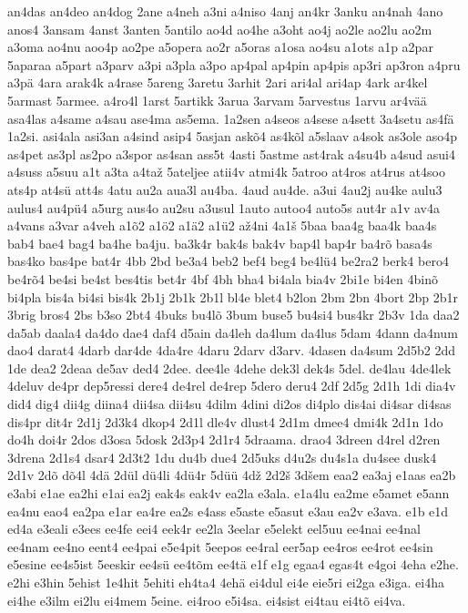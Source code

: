 {an4das
an4deo
an4dog
2ane
a4neh
a3ni
a4niso
4anj
an4kr
3anku
an4nah
4ano
anos4
3ansam
4anst
3anten
5antilo
ao4d
ao4he
a3oht
ao4j
ao2le
ao2lu
ao2m
a3oma
ao4nu
aoo4p
ao2pe
a5opera
ao2r
a5oras
a1osa
ao4su
a1ots
a1p
a2par
5aparaa
a5part
a3parv
a3pi
a3pla
a3po
ap4pal
ap4pin
ap4pis
ap3ri
ap3ron
a4pru
a3pä
4ara
arak4k
a4rase
5areng
3aretu
3arhit
2ari
ari4al
ari4ap
4ark
ar4kel
5armast
5armee.
a4ro4l
1arst
5artikk
3arua
3arvam
5arvestus
1arvu
ar4vää
asa4las
a4same
a4sau
ase4ma
as5ema.
1a2sen
a4seos
a4sese
a4sett
3a4setu
as4fä
1a2si.
asi4ala
asi3an
a4sind
asip4
5asjan
askõ4
as4kõl
a5slaav
a4sok
as3ole
aso4p
as4pet
as3pl
as2po
a3spor
as4san
ass5t
4asti
5astme
ast4rak
a4su4b
a4sud
asui4
a4suss
a5suu
a1t
a3ta
a4taž
5ateljee
atii4v
atmi4k
5atroo
at4ros
at4rus
at4soo
ats4p
at4sü
att4s
4atu
au2a
aua3l
au4ba.
4aud
au4de.
a3ui
4au2j
au4ke
aulu3
aulus4
au4pü4
a5urg
aus4o
au2su
a3usul
1auto
autoo4
auto5s
aut4r
a1v
av4a
a4vans
a3var
a4veh
a1õ2
a1ö2
a1ä2
a1ü2
až4ni
4a1š
5baa
baa4g
baa4k
baa4s
bab4
bae4
bag4
ba4he
ba4ju.
ba3k4r
bak4s
bak4v
bap4l
bap4r
ba4rõ
basa4s
bas4ko
bas4pe
bat4r
4bb
2bd
be3a4
beb2
bef4
beg4
be4lü4
be2ra2
berk4
bero4
be4rõ4
be4si
be4st
bes4tis
bet4r
4bf
4bh
bha4
bi4ala
bia4v
2bi1e
bi4en
4binõ
bi4pla
bis4a
bi4si
bis4k
2b1j
2b1k
2b1l
bl4e
blet4
b2lon
2bm
2bn
4bort
2bp
2b1r
3brig
bros4
2bs
b3so
2bt4
4buks
bu4lõ
3bum
buse5
bu4si4
bus4kr
2b3v
1da
daa2
da5ab
daala4
da4do
dae4
daf4
d5ain
da4leh
da4lum
da4lus
5dam
4dann
da4num
dao4
darat4
4darb
dar4de
4da4re
4daru
2darv
d3arv.
4dasen
da4sum
2d5b2
2dd
1de
dea2
2deaa
de5av
ded4
2dee.
dee4le
4dehe
dek3l
dek4s
5del.
de4lau
4de4lek
4deluv
de4pr
dep5ressi
dere4
de4rel
de4rep
5dero
deru4
2df
2d5g
2d1h
1di
dia4v
did4
dig4
dii4g
diina4
dii4sa
dii4su
4dilm
4dini
di2os
di4plo
dis4ai
di4sar
di4sas
dis4pr
dit4r
2d1j
2d3k4
dkop4
2d1l
dle4v
dlust4
2d1m
dmee4
dmi4k
2d1n
1do
do4h
doi4r
2dos
d3osa
5dosk
2d3p4
2d1r4
5draama.
drao4
3dreen
d4rel
d2ren
3drena
2d1s4
dsar4
2d3t2
1du
du4b
due4
2d5uks
d4u2s
du4s1a
du4see
dusk4
2d1v
2dõ
dõ4l
4dä
2dül
dü4li
4dü4r
5düü
4dž
2d2š
3dšem
eaa2
ea3aj
e1aas
ea2b
e3abi
e1ae
ea2hi
e1ai
ea2j
eak4s
eak4v
ea2la
e3ala.
e1a4lu
ea2me
e5amet
e5ann
ea4nu
eao4
ea2pa
e1ar
ea4re
ea2s
e4ass
e5aste
e5asut
e3au
ea2v
e3ava.
e1b
e1d
ed4a
e3eali
e3ees
ee4fe
eei4
eek4r
ee2la
3eelar
e5elekt
eel5uu
ee4nai
ee4nal
ee4nam
ee4no
eent4
ee4pai
e5e4pit
5eepos
ee4ral
eer5ap
ee4ros
ee4rot
ee4sin
e5esine
ee4s5ist
5eeskir
ee4sü
ee4tõm
ee4tä
e1f
e1g
egaa4
egas4t
e4goi
4eha
e2he.
e2hi
e3hin
5ehist
1e4hit
5ehiti
eh4ta4
4ehä
ei4dul
ei4e
eie5ri
ei2ga
e3iga.
ei4ha
ei4he
e3ilm
ei2lu
ei4mem
5eine.
ei4roo
e5i4sa.
ei4sist
ei4tau
ei4tõ
ei4va.
}

